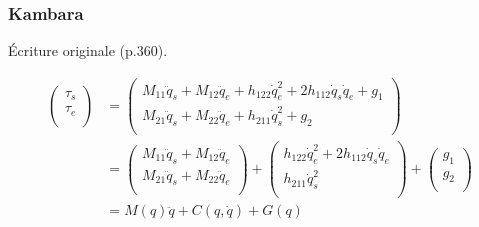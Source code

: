 \documentclass[pdftex,a4paper,11pt]{article}
\numberwithin{equation}{subsection}
\begin{document}

\subsubsection{Kambara}
Écriture originale \cite{kambara2009} (p.360).

\begin{align*}
    \begin{pmatrix}
        \tau_s \\
        \tau_e \\
    \end{pmatrix}
    & = \begin{pmatrix}
        M_{11}\ddot{q}_s + M_{12}\ddot{q}_e + h_{122}\dot{q}_e^2 + 2h_{112}\dot{q}_s\dot{q}_e + g_1 \\
        M_{21}\ddot{q}_s + M_{22}\ddot{q}_e + h_{211}\dot{q}_s^2 + g_2 \\
    \end{pmatrix}\\
    & = \begin{pmatrix}
        M_{11}\ddot{q}_s + M_{12}\ddot{q}_e \\
        M_{21}\ddot{q}_s + M_{22}\ddot{q}_e \\
    \end{pmatrix} +
    \begin{pmatrix}
        h_{122}\dot{q}_e^2 + 2h_{112}\dot{q}_s\dot{q}_e \\
        h_{211}\dot{q}_s^2 \\
    \end{pmatrix} +
    \begin{pmatrix}
        g_1 \\
        g_2 \\
    \end{pmatrix}\\
    & = M(q) \ddot{q} + C(q, \dot{q}) + G(q)
\end{align*}
\end{document}
